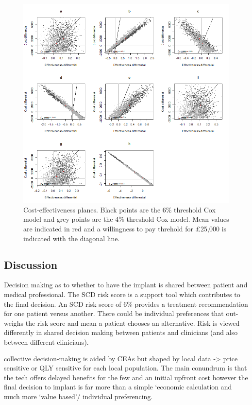 \documentclass[
]{article}
\begin{document}
\begin{figure}

{\centering \includegraphics[width=0.6\linewidth]{../../images/ceplane_grid} 

}

\caption{Cost-effectiveness planes. Black points are the 6\% threshold Cox model and grey points are the 4\% threshold Cox model. Mean values are indicated in red and a willingness to pay threhold for £25,000 is indicated with the diagonal line.}\label{fig:ceplane}
\end{figure}

\hypertarget{discussion}{%
\subsection{Discussion}\label{discussion}}

Decision making as to whether to have the implant is shared between
patient and medical professional. The SCD risk score is a support tool
which contributes to the final decision. An SCD risk score of 6\%
provides a treatment recommendation for one patient versus another.
There could be individual preferences that out-weighs the risk score and
mean a patient chooses an alternative. Risk is viewed differently in
shared decision making between patients and clinicians (and also between
different clinicians).

collective decision-making is aided by CEAs but shaped by local data
-\textgreater{} price sensitive or QLY sensitive for each local
population. The main conundrum is that the tech offers delayed benefits
for the few and an initial upfront cost however the final decision to
implant is far more than a simple `economic calculation and much more
`value based'/ individual preferencing.
\end{document}
